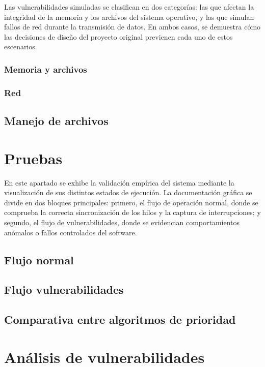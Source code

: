 \documentclass{article}
\begin{document}
Las vulnerabilidades simuladas se clasifican en dos categorías: las que afectan la integridad
de la memoria y los archivos del sistema operativo, y las que simulan fallos de red durante la
transmisión de datos. En ambos casos, se demuestra cómo las decisiones de diseño del proyecto
original previenen cada uno de estos escenarios.

\subsubsection{Memoria y archivos}\label{sec:seguridad-memoria}


\subsubsection{Red}\label{sec:seguridad-red}


\subsection{Manejo de archivos}


\section{Pruebas}
En este apartado se exhibe la validación empírica del sistema mediante la visualización de sus distintos estados de ejecución.
La documentación gráfica se divide en dos bloques principales: primero, el flujo de operación normal,
donde se comprueba la correcta sincronización de los hilos y la captura de interrupciones; y segundo, el flujo de vulnerabilidades,
donde se evidencian comportamientos anómalos o fallos controlados del software.

\subsection{Flujo normal}

\subsection{Flujo vulnerabilidades}

\subsection{Comparativa entre algoritmos de prioridad}


\section{Análisis de vulnerabilidades}
\end{document}
